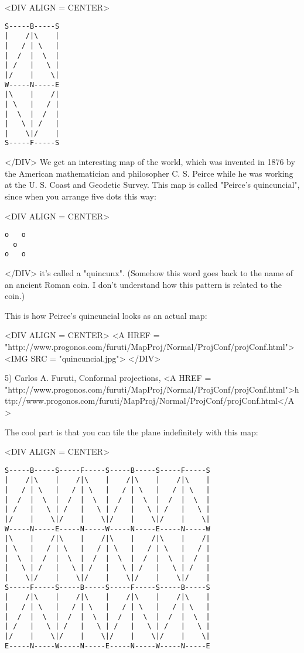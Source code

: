 <DIV ALIGN = CENTER>
\begin{verbatim}
S-----B-----S
|    /|\    |
|   / | \   |
|  /  |  \  |
| /   |   \ |
|/    |    \|
W-----N-----E
|\    |    /|
| \   |   / |
|  \  |  /  |
|   \ | /   |
|    \|/    |
S-----F-----S
\end{verbatim}
    
</DIV>
We get an interesting map of the world, which was invented in 1876
by the American mathematician and philosopher C. S. Peirce while he
was working at the U. S. Coast and Geodetic Survey.   This map is 
called "Peirce's quincuncial", since when you arrange five dots this 
way:

<DIV ALIGN = CENTER>
\begin{verbatim}
o   o
  o  
o   o
\end{verbatim}
    
</DIV>
it's called a "quincunx".  (Somehow this word
goes back to the name of an ancient Roman coin.  I don't understand 
how this pattern is related to the coin.)

This is how Peirce's quincuncial looks as an actual map:

<DIV ALIGN = CENTER>
<A HREF = 
"http://www.progonos.com/furuti/MapProj/Normal/ProjConf/projConf.html">
<IMG SRC = "quincuncial.jpg">
</DIV>

5) Carlos A. Furuti, Conformal projections, 
<A HREF = "http://www.progonos.com/furuti/MapProj/Normal/ProjConf/projConf.html">http://www.progonos.com/furuti/MapProj/Normal/ProjConf/projConf.html</A>

The cool part is that you can tile the plane indefinitely with 
this map:

<DIV ALIGN = CENTER>
\begin{verbatim}
S-----B-----S-----F-----S-----B-----S-----F-----S
|    /|\    |    /|\    |    /|\    |    /|\    |
|   / | \   |   / | \   |   / | \   |   / | \   |
|  /  |  \  |  /  |  \  |  /  |  \  |  /  |  \  |
| /   |   \ | /   |   \ | /   |   \ | /   |   \ |
|/    |    \|/    |    \|/    |    \|/    |    \|
W-----N-----E-----N-----W-----N-----E-----N-----W
|\    |    /|\    |    /|\    |    /|\    |    /|
| \   |   / | \   |   / | \   |   / | \   |   / |
|  \  |  /  |  \  |  /  |  \  |  /  |  \  |  /  |
|   \ | /   |   \ | /   |   \ | /   |   \ | /   |
|    \|/    |    \|/    |    \|/    |    \|/    |
S-----F-----S-----B-----S-----F-----S-----B-----S
|    /|\    |    /|\    |    /|\    |    /|\    |
|   / | \   |   / | \   |   / | \   |   / | \   |
|  /  |  \  |  /  |  \  |  /  |  \  |  /  |  \  |
| /   |   \ | /   |   \ | /   |   \ | /   |   \ |
|/    |    \|/    |    \|/    |    \|/    |    \|
E-----N-----W-----N-----E-----N-----W-----N-----E
\end{verbatim}
    
